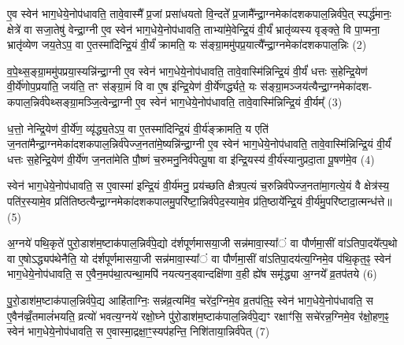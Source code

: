 ए॒व स्वेन॑ भाग॒धेये॒नोप॑धावति॒ तावे॒वास्मै᳚ प्र॒जां प्रसा॑धयतो वि॒न्दते᳚ प्र॒जामै᳚न्द्रा॒ग्नमेका॑दशकपाल॒न्निर्व॑पे॒त् स्पर्द्ध॑मानः॒ क्षेत्रे॑ वा सजा॒तेषु॑ वेन्द्रा॒ग्नी ए॒व स्वेन॑ भाग॒धेये॒नोप॑धावति॒ ताभ्या॑मे॒वेन्द्रि॒यं वी॒र्यं॑ भ्रातृ॑व्यस्य वृङ्क्ते॒ वि पा॒प्मना॒ भ्रातृ॑व्येण जय॒ते\-ऽप॒ वा ए॒तस्मा॑दिन्द्रि॒यं वी॒र्यं॑ क्रामति॒ यः स॑ङ्ग्रा॒ममु॑पप्र॒यात्यै᳚न्द्रा॒ग्नमेका॑दशकपाल॒न्निः (2)

व॒पे॒थ्स॒ङ्ग्रा॒ममु॑पप्रया॒स्यन्नि॑न्द्रा॒ग्नी ए॒व स्वेन॑ भाग॒धेये॒नोप॑धावति॒ तावे॒वास्मि॑न्निन्द्रि॒यं वी॒र्यं॑ धत्तः स॒हेन्द्रि॒येण॑ वी॒र्ये॑णोप॒प्रया॑ति॒ जय॑ति॒ तꣳ स॑ङ्ग्रा॒मं वि वा ए॒ष इ॑न्द्रि॒येण॑ वी॒र्ये॑णर्द्ध्यते॒ यः स॑ङ्ग्रा॒मञ्जय॑त्यैन्द्रा॒ग्नमेका॑दश- कपाल॒न्निर्व॑पेथ्सङ्ग्रा॒मञ्जि॒त्वेन्द्रा॒ग्नी ए॒व स्वेन॑ भाग॒धेये॒नोप॑धावति॒ तावे॒वास्मि॑न्निन्द्रि॒यं वी॒र्यम्᳚ (3)

ध॒त्तो॒ नेन्द्रि॒येण॑ वी॒र्ये॑ण॒ व्यृ॑द्ध्य॒ते\-ऽप॒ वा ए॒तस्मा॑दिन्द्रि॒यं वी॒र्य॑ङ्क्रामति॒ य एति॑ ज॒नता॑मैन्द्रा॒ग्नमेका॑दशकपाल॒न्निर्व॑पेज्ज॒नता॑मे॒ष्यन्नि॑न्द्रा॒ग्नी ए॒व स्वेन॑ भाग॒धेये॒नोप॑धावति॒ तावे॒वास्मि॑न्निन्द्रि॒यं वी॒र्यं॑ धत्तः स॒हेन्द्रि॒येण॑ वी॒र्ये॑ण ज॒नता॑मेति पौ॒ष्णं च॒रुमनु॒निर्व॑पेत्पू॒षा वा इ॑न्द्रि॒यस्य॑ वी॒र्य॑स्यानुप्रदा॒ता पू॒षण॑मे॒व (4)

स्वेन॑ भाग॒धेये॒नोप॑धावति॒ स ए॒वास्मा॑ इन्द्रि॒यं वी॒र्य॑मनु॒ प्रय॑च्छति क्षैत्रप॒त्यं च॒रुन्निर्व॑पेज्ज॒नता॑मा॒गत्ये॒यं वै क्षेत्र॑स्य॒ पति॑र॒स्यामे॒व प्रति॑तिष्ठत्यैन्द्रा॒ग्नमेका॑दशकपालमु॒परि॑ष्टा॒न्निर्व॑पेद॒स्यामे॒व प्र॑ति॒ष्ठाये᳚न्द्रि॒यं वी॒र्य॑मु॒परि॑ष्टादा॒त्मन्ध॑त्ते॥ (5)

{\anuvakamend[{प्र॒जाका॑म इन्द्रा॒ग्नी उ॑पप्र॒यात्यै᳚न्द्रा॒ग्नमेका॑दशकपाल॒न्निर्वी॒र्यं॑ पू॒षण॑मे॒वैका॒न्नच॑त्वारि॒ꣳ॒शच्च॑॥1।}]}

अ॒ग्नये॑ पथि॒कृते॑ पुरो॒डाश॑म॒ष्टाक॑पाल॒न्निर्व॑पे॒द्यो द॑र्\mbox{}शपूर्णमासया॒जी सन्न॑मावा॒स्या᳚ं वा पौर्णमा॒सीं वा॑\-ऽतिपा॒दये᳚त्प॒थो वा ए॒षो\-ऽद्ध्यप॑थेनैति॒ यो द॑र्\mbox{}शपूर्णमासया॒जी सन्न॑मावा॒स्या᳚ं वा पौर्णमा॒सीं वा॑\-ऽतिपा॒दय॑त्य॒ग्निमे॒व प॑थि॒कृत॒ꣴ॒ स्वेन॑ भाग॒धेये॒नोप॑धावति॒ स ए॒वैन॒मप॑था॒त्पन्था॒मपि॑ नयत्यन॒ड्वान्दक्षि॑णा व॒ही ह्ये॑ष समृ॑द्ध्या अ॒ग्नये᳚ व्र॒तप॑तये (6)

पु॒रो॒डाश॑म॒ष्टाक॑पाल॒न्निर्व॑पे॒द्य आहि॑ताग्निः॒ सन्न॑व्र॒त्यमि॑व॒ चरे॑द॒ग्निमे॒व व्र॒तप॑ति॒ꣴ॒ स्वेन॑ भाग॒धेये॒नोप॑धावति॒ स ए॒वैन॑व्व्रँ॒तमालं॑भयति॒ व्रत्यो॑ भवत्य॒ग्नये॑ रक्षो॒घ्ने पु॑रो॒डाश॑म॒ष्टाक॑पाल॒न्निर्व॑पे॒द्यꣳ रक्षाꣳ॑सि॒ सचे॑रन्न॒ग्निमे॒व र॑क्षो॒हण॒ꣴ॒ स्वेन॑ भाग॒धेये॒नोप॑धावति॒ स ए॒वास्मा॒द्रक्षा॒ꣳ॒स्यप॑हन्ति॒ निशि॑ताया॒न्निर्व॑पेत् (7)

